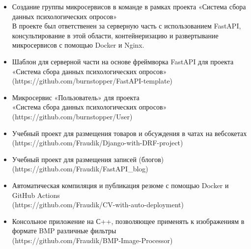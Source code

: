 \documentclass[10pt,a4paper]{altacv}
\begin{document}
\begin{itemize}
\item Создание группы микросервисов в команде в рамках проекта «Система сбора данных психологических опросов» \\
В проекте был ответственен за серверную часть с использованием FastAPI, консультирование в этой области, контейнеризацию и развертывание микросервисов с помощью Docker и Nginx. \\
\item Шаблон для серверной части на основе фреймворка FastAPI для проекта «Система сбора данных психологических опросов» \\
(https://github.com/burnstopper/FastAPI-template) \\
\item Микросервис «Пользователь» для проекта \\ «Система сбора данных психологических опросов» \\
(https://github.com/burnstopper/User) \\
\item Учебный проект для размещения товаров и обсуждения в чатах на вебсокетах
(https://github.com/Fraudik/Django-with-DRF-project) \\
\item Учебный проект для размещения записей (блогов)
(https://github.com/Fraudik/FastAPI\_blog) \\
\item Автоматическая компиляция и публикация резюме с помощью Docker и GitHub Actions \\
(https://github.com/Fraudik/CV-with-auto-deployment) \\
\item  Консольное приложение на С++, позволяющее применять к изображениям в формате BMP различные фильтры \\
(https://github.com/Fraudik/BMP-Image-Processor) \\
\end{itemize}
\end{document}
